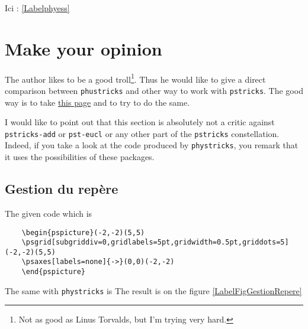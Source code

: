 Ici : \ref{Labelphyess}




\section{Make your opinion}

The author likes to be a good troll\footnote{Not as good as Linus Torvalds, but I'm trying very hard.}. Thus he would like to give a direct comparison between \verb+phustricks+ and other way to work with \verb+pstricks+. The good way is to take \href{http://ww2.ac-poitiers.fr/math/spip.php?page=imprime&id_article=134}{this page} and to try to do the same.

I would like to point out that this section is absolutely not a critic against \verb+pstricks-add+ or \verb+pst-eucl+ or any other part of the \verb+pstricks+ constellation. Indeed, if you take a look at the code produced by \verb+phystricks+, you remark that it uses the possibilities of these packages.

\subsection{Gestion du repère}

The given code which is
\begin{verbatim}
	\begin{pspicture}(-2,-2)(5,5)
	\psgrid[subgriddiv=0,gridlabels=5pt,gridwidth=0.5pt,griddots=5](-2,-2)(5,5)
	\psaxes[labels=none]{->}(0,0)(-2,-2)
	\end{pspicture}
\end{verbatim}
The same with \verb+phystricks+ is
The result is on the figure \ref{LabelFigGestionRepere}
\newcommand{\CaptionFigGestionRepere}{Axes and grid}


